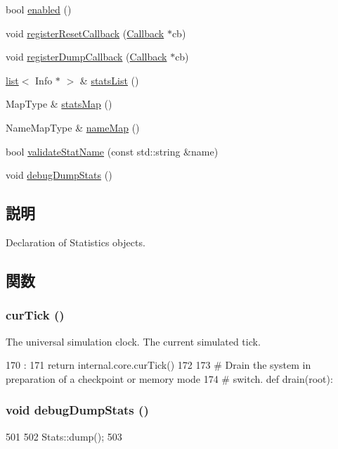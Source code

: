\begin{DoxyCompactItemize}
\item 
bool \hyperlink{namespaceStats_acafb7271189f6d844921794d61cd608a}{enabled} ()
\item 
void \hyperlink{namespaceStats_a3b9643eddeef663a234d6cfa2bcf06f2}{registerResetCallback} (\hyperlink{classCallback}{Callback} $\ast$cb)
\item 
void \hyperlink{namespaceStats_a4530b3818e2e1811b7ad063fe38bedc1}{registerDumpCallback} (\hyperlink{classCallback}{Callback} $\ast$cb)
\item 
\hyperlink{classstd_1_1list}{list}$<$ Info $\ast$ $>$ \& \hyperlink{namespaceStats_aa77032793ad2536948870c4a48553c67}{statsList} ()
\item 
MapType \& \hyperlink{namespaceStats_a021e4926d541f56c518e0be77bbdb615}{statsMap} ()
\item 
NameMapType \& \hyperlink{namespaceStats_afb176e85b0894034fbc81210827060d9}{nameMap} ()
\item 
bool \hyperlink{namespaceStats_a62d3f8e1a5873346c840f87a24e8b2ee}{validateStatName} (const std::string \&name)
\item 
void \hyperlink{statistics_8hh_a20ffbd4f2cb43409f0395236df461288}{debugDumpStats} ()
\end{DoxyCompactItemize}


\subsection{説明}
Declaration of Statistics objects. 

\subsection{関数}
\hypertarget{statistics_8hh_a7acdccbf0d35ce0c159c0cdd36371b22}{
\subsubsection[{curTick}]{ curTick ()}}
\label{statistics_8hh_a7acdccbf0d35ce0c159c0cdd36371b22}


The universal simulation clock. The current simulated tick. 


\begin{DoxyCode}
170              :
171     return internal.core.curTick()
172 
173 # Drain the system in preparation of a checkpoint or memory mode
174 # switch.
def drain(root):
\end{DoxyCode}
\hypertarget{statistics_8hh_a20ffbd4f2cb43409f0395236df461288}{
\subsubsection[{debugDumpStats}]{\setlength{\rightskip}{0pt plus 5cm}void debugDumpStats ()}}
\label{statistics_8hh_a20ffbd4f2cb43409f0395236df461288}



\begin{DoxyCode}
501 {
502     Stats::dump();
503 }
\end{DoxyCode}
